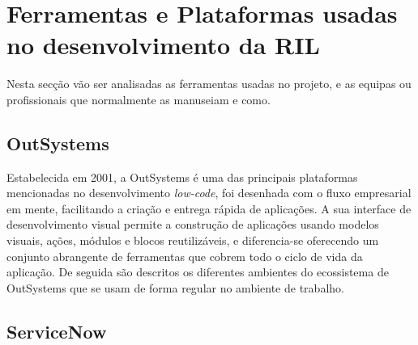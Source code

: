 \section{Ferramentas e Plataformas usadas no desenvolvimento da RIL}

    Nesta secção vão ser analisadas as ferramentas usadas no projeto, e as equipas ou profissionais que normalmente as manuseiam e como.

    \subsection{OutSystems}\label{sec:outsystems}
    
        Estabelecida em 2001, a OutSystems é uma das principais plataformas mencionadas no desenvolvimento \textit{low-code}, foi desenhada com o fluxo empresarial em mente, facilitando a criação e entrega rápida de aplicações. A sua interface de desenvolvimento visual permite a construção de aplicações usando modelos visuais, ações, módulos e blocos reutilizáveis, e diferencia-se oferecendo um conjunto abrangente de ferramentas que cobrem todo o ciclo de vida da aplicação\cite{os-vision}. De seguida são descritos os diferentes ambientes do ecossistema de OutSystems que se usam de forma regular no ambiente de trabalho.
                    
        

        

        

    \subsection{ServiceNow}\label{sec:service-now}

